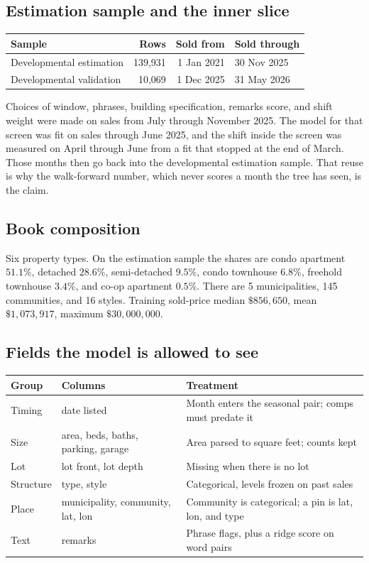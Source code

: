 \documentclass[11pt]{article}
\begin{document}
\subsection{Estimation sample and the inner slice}

\begin{center}
\begin{tabular}{lrrl}
\toprule
Sample & Rows & Sold from & Sold through \\
\midrule
Developmental estimation & 139{,}931 & 1 Jan 2021 & 30 Nov 2025 \\
Developmental validation & 10{,}069 & 1 Dec 2025 & 31 May 2026 \\
\bottomrule
\end{tabular}
\end{center}

Choices of window, phrases, building specification, remarks score, and shift weight were made on sales from July through November 2025. The model for that screen was fit on sales through June 2025, and the shift inside the screen was measured on April through June from a fit that stopped at the end of March. Those months then go back into the developmental estimation sample. That reuse is why the walk-forward number, which never scores a month the tree has seen, is the claim.

\subsection{Book composition}

Six property types. On the estimation sample the shares are condo apartment \(51.1\%\), detached \(28.6\%\), semi-detached \(9.5\%\), condo townhouse \(6.8\%\), freehold townhouse \(3.4\%\), and co-op apartment \(0.5\%\). There are 5 municipalities, 145 communities, and 16 styles. Training sold-price median \(\$856{,}650\), mean \(\$1{,}073{,}917\), maximum \(\$30{,}000{,}000\).

\subsection{Fields the model is allowed to see}

\begin{center}
\small
\begin{tabular}{llp{6.4cm}}
\toprule
Group & Columns & Treatment \\
\midrule
Timing & date listed & Month enters the seasonal pair; comps must predate it \\
Size & area, beds, baths, parking, garage & Area parsed to square feet; counts kept \\
Lot & lot front, lot depth & Missing when there is no lot \\
Structure & type, style & Categorical, levels frozen on past sales \\
Place & municipality, community, lat, lon & Community is categorical; a pin is lat, lon, and type \\
Text & remarks & Phrase flags, plus a ridge score on word pairs \\
\bottomrule
\end{tabular}
\end{center}
\end{document}

